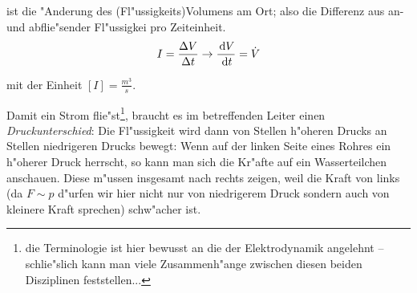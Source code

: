 \begin{Def}
    ist die "Anderung des
   (Fl"ussigkeits)Volumens am Ort; also die Differenz aus an- und
   abflie"sender Fl"ussigkei pro Zeiteinheit.
   \begin{equation}
      \label{eqn_def_stromstaerke}
      I = \frac{\Delta V}{\Delta  t} \to \frac{\, \mathrm{d} V}{\, \mathrm{d} t} =
      \dot V
   \end{equation}
\end{Def}
mit der Einheit $[I] = \frac{m^3}{s}$.

Damit ein Strom flie"st\footnote{die Terminologie ist hier bewusst an
  die der Elektrodynamik angelehnt -- schlie"slich kann man viele
  Zusammenh"ange zwischen diesen beiden Disziplinen feststellen...},
braucht es im betreffenden Leiter einen \emph{Druckunterschied}: Die
Fl"ussigkeit wird dann von Stellen h"oheren Drucks an Stellen
niedrigeren Drucks bewegt: Wenn auf der linken Seite eines Rohres ein
h"oherer Druck herrscht, so kann man sich die Kr"afte auf ein
Wasserteilchen anschauen. Diese m"ussen insgesamt nach rechts zeigen,
weil die Kraft von links (da $F \sim p$ d"urfen wir hier nicht nur von
niedrigerem Druck sondern auch von kleinere Kraft sprechen) schw"acher
ist.

